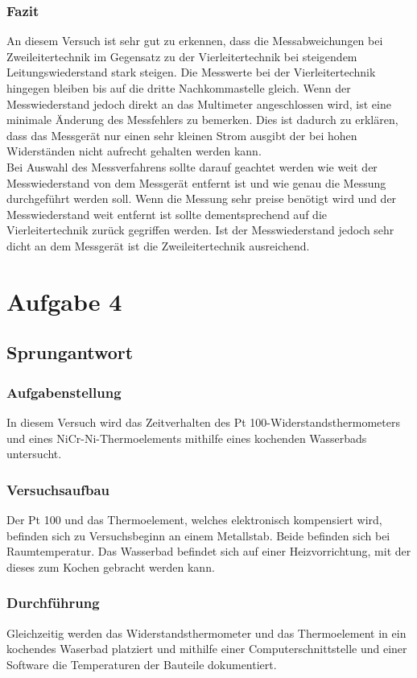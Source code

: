 \documentclass[a4paper,11pt,oneside]{article}
\begin{document}
\subsubsection{Fazit}
An diesem Versuch ist sehr gut zu erkennen, dass die Messabweichungen bei Zweileitertechnik im Gegensatz zu der Vierleitertechnik bei steigendem Leitungswiederstand stark steigen. Die Messwerte bei der Vierleitertechnik hingegen bleiben bis auf die dritte Nachkommastelle gleich. Wenn der Messwiederstand jedoch direkt an das Multimeter angeschlossen wird, ist eine minimale Änderung des Messfehlers zu bemerken. Dies ist dadurch zu erklären, dass das Messgerät nur einen sehr kleinen Strom ausgibt der bei hohen Widerständen nicht aufrecht gehalten werden kann.\\
Bei Auswahl des Messverfahrens sollte darauf geachtet werden wie weit der Messwiederstand von dem Messgerät entfernt ist und wie genau die Messung durchgeführt werden soll. Wenn die Messung sehr preise benötigt wird und der Messwiederstand weit entfernt ist sollte dementsprechend auf die Vierleitertechnik zurück gegriffen werden. Ist der Messwiederstand jedoch sehr dicht an dem Messgerät ist die Zweileitertechnik ausreichend.

\section{Aufgabe 4}
\subsection{Sprungantwort}
\subsubsection{Aufgabenstellung}
In diesem Versuch wird das Zeitverhalten des Pt 100-Widerstandsthermometers und eines NiCr-Ni-Thermoelements mithilfe eines kochenden Wasserbads untersucht. 
\subsubsection{Versuchsaufbau}
Der Pt 100 und das Thermoelement, welches elektronisch kompensiert wird, befinden sich zu Versuchsbeginn an einem Metallstab. Beide befinden sich bei Raumtemperatur. Das Wasserbad befindet sich auf einer Heizvorrichtung, mit der dieses zum Kochen gebracht werden kann. 
\subsubsection{Durchführung}
Gleichzeitig werden das Widerstandsthermometer und das Thermoelement in ein kochendes Waserbad platziert und mithilfe einer Computerschnittstelle und einer Software die Temperaturen der Bauteile dokumentiert. 
\end{document}
